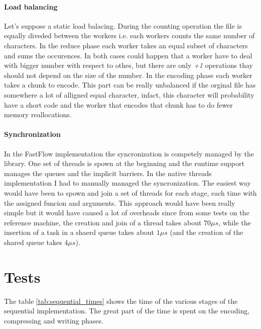 \documentclass[12pt, letterpaper]{article}  %
\begin{document}
\paragraph*{Load balancing}
Let's suppose a static load balacing. During the counting operation the file is equally diveded between the workers i.e. each workers counts the same
number of characters. In the reduce phase each worker takes an equal subset of characters and sums the occurences.
In both cases could happen that a worker have to deal with bigger number with respect to othes, but there are 
only \textit{+1} operations thay should not depend on the size of the number. In the encoding phase each
worker takes a chunk to encode. This part can be really unbalanced if the orginal file has somewhere a lot of 
alligned equal character, infact, this character will probability have a short code and the worker 
that encodes that chunk has to do fewer memory reallocations.

\paragraph*{Synchronization}
In the FastFlow implementation the syncronization is competely managed by the library. One set of threads
is spown at the beginning and the runtime support manages the queues and the implicit barriers.
In the native threads implementation I had to manually managed the syncronization. The easiest way
would have been to spown and join a set of threads for each stage, each time with the assigned funcion 
and arguments. This approach would have been really simple but it would have caused a lot of overheads since
from some tests on the reference machine, the creation and join of a thread takes about $70 \mu s$, while the 
insertion of a task in a shaerd queue takes about $1 \mu s$ (and the creation of the shared queue takes $4 \mu s$).




\section{Tests \label{sec:tests}}

The table \ref{tab:sequential_times} shows the time of the various stages of the sequential implementation. The great part of the time is spent on the encoding, compressing and writing phases.
\end{document}
